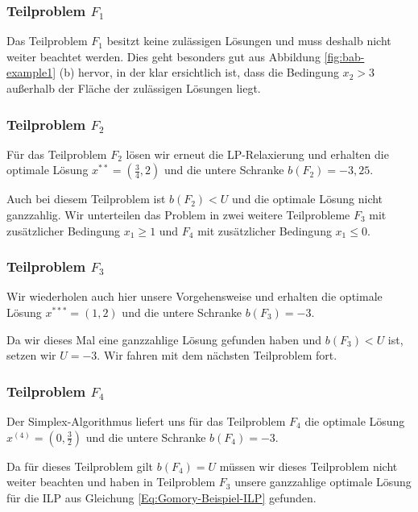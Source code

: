 \documentclass[tog]{acmsiggraph}
\begin{document}
\subsubsection*{Teilproblem $F_1$}

Das Teilproblem $F_1$ besitzt keine zulässigen Lösungen und muss deshalb nicht weiter beachtet werden. Dies geht besonders gut aus Abbildung \ref{fig:bab-example1} (b) hervor, in der klar ersichtlich ist, dass die Bedingung $x_2 > 3$ außerhalb der Fläche der zulässigen Lösungen liegt.

\subsubsection*{Teilproblem $F_2$}

Für das Teilproblem $F_2$ lösen wir erneut die LP-Relaxierung und erhalten die optimale Lösung $x^{**} = (\frac{3}{4}, 2)$ und die untere Schranke $b(F_2) = -3,25$.

Auch bei diesem Teilproblem ist $b(F_2) < U$ und die optimale Lösung nicht ganzzahlig. Wir unterteilen das Problem in zwei weitere Teilprobleme $F_3$ mit zusätzlicher Bedingung $x_1 \geq 1$ und $F_4$ mit zusätzlicher Bedingung $x_1 \leq 0$.

\subsubsection*{Teilproblem $F_3$}

Wir wiederholen auch hier unsere Vorgehensweise und erhalten die optimale Lösung $x^{***} = (1, 2)$ und die untere Schranke $b(F_3) = -3$.

Da wir dieses Mal eine ganzzahlige Lösung gefunden haben und $b(F_3) < U$ ist, setzen wir $U = -3$. Wir fahren mit dem nächsten Teilproblem fort.

\subsubsection*{Teilproblem $F_4$}

Der Simplex-Algorithmus liefert uns für das Teilproblem $F_4$ die optimale Lösung $x^{(4)} = (0, \frac{3}{2})$ und die untere Schranke $b(F_4) = -3$.

Da für dieses Teilproblem gilt $b(F_4) = U$ müssen wir dieses Teilproblem nicht weiter beachten und haben in Teilproblem $F_3$ unsere ganzzahlige optimale Lösung für die ILP aus Gleichung \ref{Eq:Gomory-Beispiel-ILP} gefunden.
\end{document}
